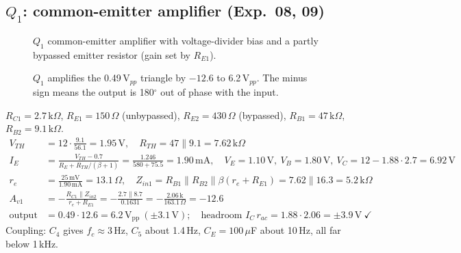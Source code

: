 \subsection{$Q_1$: common-emitter amplifier (Exp.\ 08, 09)}
\begin{figure}[H]
\centering
{}
\caption{$Q_1$ common-emitter amplifier with voltage-divider bias and a partly bypassed emitter resistor (gain set by $R_{E1}$).}
\end{figure}

\begin{figure}[H]
\centering
{}
\caption{$Q_1$ amplifies the 0.49\,V$_{pp}$ triangle by $-12.6$ to 6.2\,V$_{pp}$. The minus sign means the output is 180$^\circ$ out of phase with the input.}
\end{figure}

\begin{tcolorbox}[colback=blue!3,colframe=blue!40!black,title=Calculations,fonttitle=\small\bfseries,boxrule=0.4pt]
\small
$R_{C1}=2.7\,\mathrm{k}\Omega$, $R_{E1}=150\,\Omega$ (unbypassed), $R_{E2}=430\,\Omega$ (bypassed), $R_{B1}=47\,\mathrm{k}\Omega$, $R_{B2}=9.1\,\mathrm{k}\Omega$.
\begin{align*}
V_{TH}&=12\cdot\tfrac{9.1}{56.1}=1.95\,\mathrm V,\quad R_{TH}=47\parallel9.1=7.62\,\mathrm{k}\Omega\\
I_E&=\frac{V_{TH}-0.7}{R_E+R_{TH}/(\beta+1)}=\frac{1.246}{580+75.5}=1.90\,\mathrm{mA},\quad V_E=1.10\,\mathrm V,\ V_B=1.80\,\mathrm V,\ V_C=12-1.88\cdot2.7=6.92\,\mathrm V\\
r_e&=\frac{25\,\mathrm{mV}}{1.90\,\mathrm{mA}}=13.1\,\Omega,\quad Z_{in1}=R_{B1}\parallel R_{B2}\parallel\beta(r_e+R_{E1})=7.62\parallel16.3=5.2\,\mathrm{k}\Omega\\
A_{v1}&=-\frac{R_{C1}\parallel Z_{in2}}{r_e+R_{E1}}=-\frac{2.7\parallel8.7}{0.1631}=-\frac{2.06\,\mathrm{k}}{163.1\,\Omega}=-12.6\\
\text{output}&=0.49\cdot12.6=6.2\,\mathrm{V_{pp}}\ (\pm3.1\,\mathrm V);\quad\text{headroom }I_C\,r_{ac}=1.88\cdot2.06=\pm3.9\,\mathrm V\ \checkmark
\end{align*}
Coupling: $C_4$ gives $f_c\approx3$\,Hz, $C_5$ about 1.4\,Hz, $C_E=100\,\mu$F about 10\,Hz, all far below 1\,kHz.
\end{tcolorbox}

